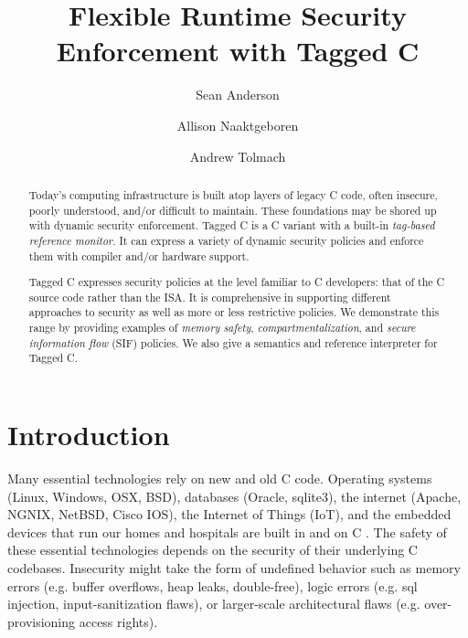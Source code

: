 \documentclass{llncs}
\title{Flexible Runtime Security Enforcement with Tagged C}
\author{Sean Anderson \and Allison Naaktgeboren \and Andrew Tolmach}
\institute{Portland State University}
\begin{document}





\maketitle

\begin{abstract}
Today's computing infrastructure is built atop layers of legacy C code, often
insecure, poorly understood, and/or difficult to maintain.
These foundations may be shored up with dynamic security enforcement.
Tagged C is a C variant with a built-in {\em tag-based reference monitor}.
It can express a variety of dynamic security policies and enforce them with
compiler and/or hardware support.

Tagged C expresses security policies at the level familiar to C developers: that
of the C source code rather than the ISA. It is comprehensive in supporting different
approaches to security as well as more or less restrictive policies. We demonstrate
this range by providing examples of {\em memory safety}, {\em compartmentalization},
and {\em secure information flow} (SIF) policies. We also give a semantics and reference
interpreter for Tagged C.
\end{abstract}

\section{Introduction}
Many essential technologies rely on new and old C code. 
Operating systems (Linux, Windows, OSX, BSD), databases (Oracle, sqlite3), the internet
(Apache, NGNIX, NetBSD, Cisco IOS), the Internet of Things (IoT), and the 
embedded devices that run our homes and hospitals are built in and on C \cite{Munoz:PoweredbyC}. 
The safety of these essential technologies
depends on the security of their underlying C codebases. Insecurity might take the form of
undefined behavior such as memory errors (e.g. buffer overflows, heap leaks, double-free),
logic errors (e.g. sql injection, input-sanitization flaws), or
larger-scale architectural flaws (e.g. over-provisioning access rights).
\end{document}
